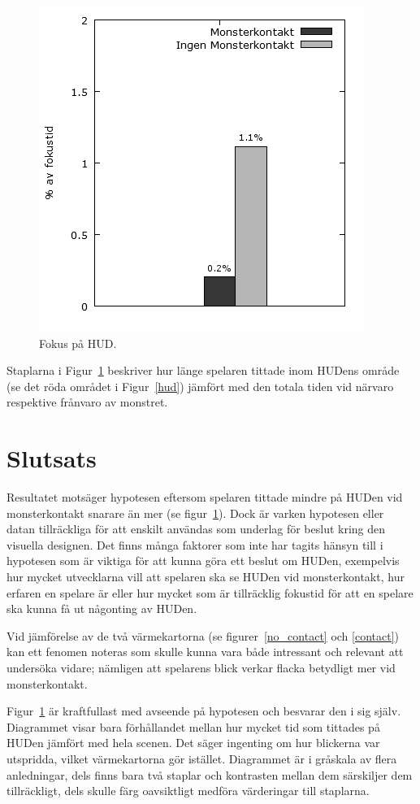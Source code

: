 \documentclass{article}
\begin{document}
\begin{figure}[h!]
    \begin{center}
        \includegraphics*[width=0.50\columnwidth]{experiment/bars-grayscale.png}
        \caption{Fokus på HUD.}
        \label{bars}
    \end{center}
\end{figure}

Staplarna i Figur~\ref{bars} beskriver hur länge spelaren tittade inom HUDens område (se det röda området i Figur~\ref{hud}) jämfört med den totala tiden vid närvaro respektive frånvaro av monstret.


\section{Slutsats}

Resultatet motsäger hypotesen eftersom spelaren tittade mindre på HUDen vid monsterkontakt snarare än mer (se figur~\ref{bars}). Dock är varken hypotesen eller datan tillräckliga för att enskilt användas som underlag för beslut kring den visuella designen. Det finns många faktorer som inte har tagits hänsyn till i hypotesen som är viktiga för att kunna göra ett beslut om HUDen, exempelvis hur mycket utvecklarna vill att spelaren ska se HUDen vid monsterkontakt, hur erfaren en spelare är eller hur mycket som är tillräcklig fokustid för att en spelare ska kunna få ut någonting av HUDen.

Vid jämförelse av de två värmekartorna (se figurer~\ref{no_contact} och \ref{contact}) kan ett fenomen noteras som skulle kunna vara både intressant och relevant att undersöka vidare; nämligen att spelarens blick verkar flacka betydligt mer vid monsterkontakt. 

Figur~\ref{bars} är kraftfullast med avseende på hypotesen och besvarar den i sig själv. Diagrammet visar bara förhållandet mellan hur mycket tid som tittades på HUDen jämfört med hela scenen. Det säger ingenting om hur blickerna var utspridda, vilket värmekartorna gör istället. Diagrammet är i gråskala av flera anledningar, dels finns bara två staplar och kontrasten mellan dem särskiljer dem tillräckligt, dels skulle färg oavsiktligt medföra värderingar till staplarna.
\end{document}
